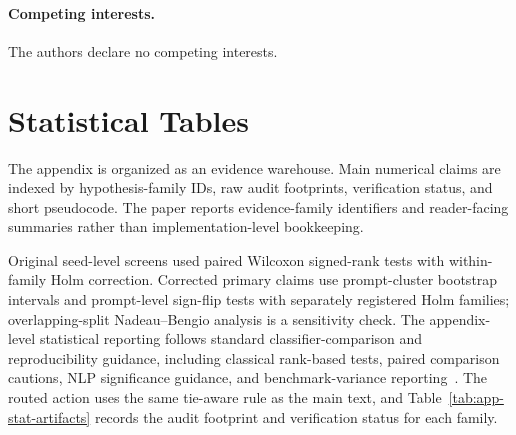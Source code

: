 \documentclass{article}
\begin{document}
\paragraph{Competing interests.}
The authors declare no competing interests.






\appendix
\linespread{0.95}\selectfont
\setlength{\textfloatsep}{7pt plus 2pt minus 2pt}
\setlength{\intextsep}{7pt plus 2pt minus 2pt}
\renewcommand{\thetable}{A.\arabic{table}}
\setcounter{table}{0}
\renewcommand{\theHtable}{appendix.\arabic{table}}
\renewcommand{\thefigure}{A.\arabic{figure}}
\setcounter{figure}{0}
\renewcommand{\theHfigure}{appendix.\arabic{figure}}

\section{Statistical Tables}
\label{app:stats}

The appendix is organized as an evidence warehouse. Main numerical claims are indexed by hypothesis-family IDs, raw audit footprints, verification status, and short pseudocode. The paper reports evidence-family identifiers and reader-facing summaries rather than implementation-level bookkeeping.

Original seed-level screens used paired Wilcoxon signed-rank tests with within-family Holm correction. Corrected primary claims use prompt-cluster bootstrap intervals and prompt-level sign-flip tests with separately registered Holm families; overlapping-split Nadeau--Bengio analysis is a sensitivity check. The appendix-level statistical reporting follows standard classifier-comparison and reproducibility guidance, including classical rank-based tests, paired comparison cautions, NLP significance guidance, and benchmark-variance reporting~\citep{friedman1937ranks, demsar2006statistical, dietterich1998approximate, benavoli2017time, dror2018hitchhiker, bouthillier2021accounting, pineau2021reproducibility}. The routed action uses the same tie-aware rule as the main text, and Table~\ref{tab:app-stat-artifacts} records the audit footprint and verification status for each family.
\end{document}
